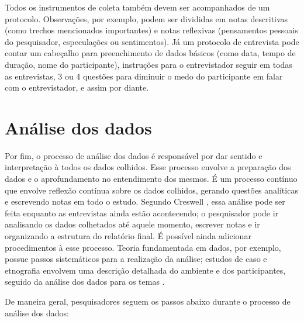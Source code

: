 Todos os instrumentos de coleta também devem ser acompanhados
de um protocolo. Observações, por exemplo, podem ser divididas em notas descritivas
(como trechos mencionados importantes) e notas reflexivas (pensamentos
pessoais do pesquisador, especulações ou sentimentos). Já um protocolo de
entrevista pode contar um cabeçalho para preenchimento de dados básicos (como data, tempo
de duração, nome do participante), instruções para o entrevistador seguir em
todas as entrevistas, 3 ou 4 questões para diminuir o medo do participante em
falar com o entrevistador, e assim por diante. 

\section{Análise dos dados}

Por fim, o processo de análise dos dados é responsável por dar sentido e
interpretação à todos os dados colhidos. Esse processo envolve a preparação dos
dados e o aprofundamento no entendimento dos mesmos. É um processo contínuo que
envolve reflexão contínua sobre os dados colhidos, gerando questões analíticas e
escrevendo notas em todo o estudo. Segundo Creswell \cite{creswell}, essa
análise pode ser feita enquanto as entrevistas ainda estão acontecendo; o
pesquisador pode ir analisando os dados colhetados até aquele momento,
escrever notas e ir organizando a estrutura do relatório final.
É possível ainda adicionar procedimentos à esse processo. Teoria fundamentada em
dados, por exemplo, possue passos sistemáticos para a realização da análise;
estudos de caso e etnografia envolvem uma descrição detalhada do ambiente e dos
participantes, seguido da análise dos dados para os temas \cite{stake}.

De maneira geral, pesquisadores seguem os passos abaixo durante o processo de
análise dos dados:

